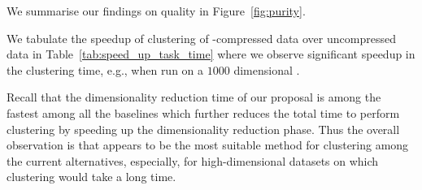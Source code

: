 


We summarise our findings on quality in Figure~\ref{fig:purity}. 


We tabulate the speedup of clustering of \fsketch-compressed data over uncompressed data in Table~\ref{tab:speed_up_task_time} where we observe significant speedup in the clustering time, e.g.,  \bl{$139\times$} when run on a $1000$ dimensional \fsketch.

Recall that the dimensionality reduction time of our proposal is among the fastest among all the baselines which further reduces the total time to perform clustering by speeding up the dimensionality reduction phase. %
Thus the overall observation is that \fsketch appears to be the most suitable method for clustering among the current alternatives, especially, for high-dimensional datasets on which clustering would take a long time.

